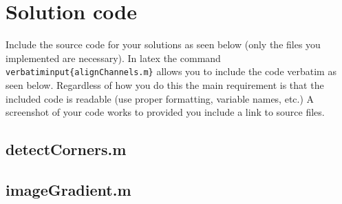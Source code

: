 \documentclass[10pt,letterpaper]{article}
\newcommand{\cmd}[1] {{\color{blue}\texttt{#1}}}
\begin{document}
\newpage

\section{Solution code}
Include the source code for your solutions as seen below (only the files you implemented are necessary). 
In latex the command \cmd{verbatiminput\{alignChannels.m\}} allows you to include the code verbatim as seen below. 
Regardless of how you do this the main requirement is that the included code is readable (use proper formatting, variable names, etc.)
A screenshot of your code works to provided you include a link to source files.



\subsection{detectCorners.m}

\subsection{imageGradient.m}

\end{document}
